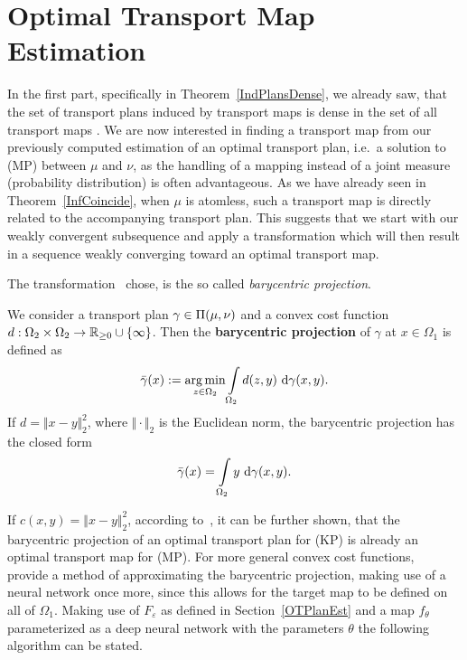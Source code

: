 \section{Optimal Transport Map Estimation}\label{OTMapEst}

In the first part, specifically in Theorem~\ref{IndPlansDense}, we already saw, that the set of transport plans induced by transport maps is dense in the set of all transport maps \TP{\mu}{\nu}. We are now interested in finding a transport map from our previously computed estimation of an optimal transport plan, i.e.~a solution to (MP) between $\mu$ and $\nu$, as the handling of a mapping instead of a joint measure (probability distribution) is often advantageous. As we have already seen in Theorem~\ref{InfCoincide}, when $\mu$ is atomless, such a transport map is directly related to the accompanying transport plan. This suggests that we start with our weakly convergent subsequence and apply a transformation which will then result in a sequence weakly converging toward an optimal transport map.

The transformation~\cite{Seg2018} chose, is the so called \textit{barycentric projection}.

\begin{definition}\label{BarCentrProj}
	We consider a transport plan $\gamma \in \TP{\mu}{\nu}$ and a convex cost function $\map[d]{\Omega_2 \times \Omega_2}{\RZero \cup \{ \infty \}}$. Then the \textbf{barycentric projection} of $\gamma$ at $x \in \Omega_1$ is defined as
	\[ \bar{\gamma}(x) := \argmin\limits_{z \in \Omega_2} \int\limits_{\Omega_2} d(z, y)~\Dx[x, y]{\gamma}. \]
	If $d = \Vert x - y \Vert_2^2$, where $\Vert \cdot \Vert_2$ is the Euclidean norm, the barycentric projection has the closed form
	\[ \bar{\gamma}(x) = \int\limits_{\Omega_2} y~\Dx[x, y]{\gamma}. \]
\end{definition}

If $c(x, y) = \Vert x - y \Vert_2^2$, according to~\cite{Seg2018}, it can be further shown, that the barycentric projection of an optimal transport plan for (KP) is already an optimal transport map for (MP). For more general convex cost functions,~\cite{Seg2018} provide a method of approximating the barycentric projection, making use of a neural network once more, since this allows for the target map to be defined on all of $\Omega_1$. Making use of $F_\varepsilon$ as defined in Section~\ref{OTPlanEst} and a map $f_\theta$ parameterized as a deep neural network with the parameters $\theta$ the following algorithm can be stated.

